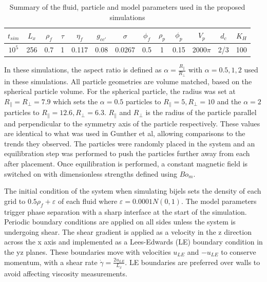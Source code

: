 \begin{table}[h!]
\centering
\begin{tabular}{||c c c c c c c c c c c c c||} 
 \hline
 $t_{sim}$ & $L_x$ & $\rho_f$ & $\tau$ & $\eta_f$ & $g_{cc'}$ & $\sigma$ & $\phi_f$ & $\rho_p$ & $\phi_p$ & $V_p$ & $d_c$ & $K_H$ \\ [0.5ex] 
 \hline\hline
 $10^5$ & 256 & 0.7 & 1 & 0.117 & 0.08 & 0.0267 & 0.5 & 1 & 0.15 & 2000$\pi$ & 2/3 & 100\\ [1ex] 
 \hline
\end{tabular}
\caption{Summary of the fluid, particle and model parameters used in the proposed simulations}
\label{table:model_params}
\end{table}

In these simulations, the aspect ratio is defined as $\alpha = \frac{R_{\parallel}}{R_{\perp}}$ with $\alpha = 0.5, 1, 2$ 
used in these simulations. All particle geometries are volume matched, based on the spherical particle volume. For the 
spherical particle, the radius was set at $R_{\parallel} = R_{\perp} = 7.9$ which sets the $\alpha = 0.5$ particles to 
$R_{\parallel} = 5, R_{\perp} = 10$ and the $\alpha = 2$ particles to $R_{\parallel} = 12.6, R_{\perp} = 6.3$. 
$R_{\parallel}$ and $R_{\perp}$ is the radius of the particle parallel and perpendicular to the symmetry axis of 
the particle respectively. These values are identical to what was used in Gunther et al, allowing comparisons to the 
trends they observed. \cite{gunther_timescales_2014} The particles were randomly placed in the system and an equilibration
step was performed to push the particles further away from each after placement. Once equilibration is performed, a 
constant magnetic field is switched on with dimensionless strengths defined using $Bo_m$.

The initial condition of the system when simulating bijels sets the density of each grid to $0.5\rho_f + \varepsilon$ of 
each fluid where $\varepsilon = 0.0001N(0,1)$. The model parameters trigger phase separation with a sharp interface at 
the start of the simulation. Periodic boundary conditions are applied on all sides unless the system is undergoing shear. 
The shear gradient is applied as a velocity in the z direction across the x axis and implemented as a Lees-Edwards 
(LE) boundary condition in the yz planes. \cite{wagner_leesedwards_2002, lorenz_lees-edwards_2009, yang_capillary_2022} 
These boundaries move with velocities $u_{LE}$ and $-u_{LE}$ to conserve momentum, with a shear rate 
$\dot{\gamma} = \frac{2 u_{LE}}{L_x}$. LE boundaries are preferred over walls to avoid affecting viscosity measurements. 
\cite{wagner_leesedwards_2002, lorenz_lees-edwards_2009, yang_capillary_2022}

